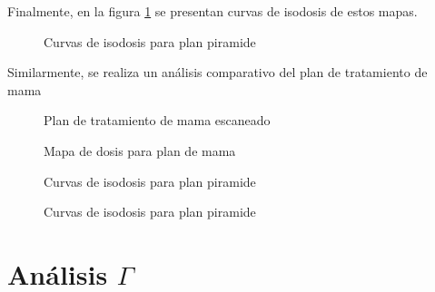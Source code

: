 Finalmente, en la figura \ref{fig:isodosisPiramide}  se presentan curvas de isodosis de estos mapas.\\ 
\begin{figure}
	\centering
	
	\caption{Curvas de isodosis para plan piramide }
	\label{fig:isodosisPiramide}
\end{figure}

Similarmente, se realiza un análisis comparativo del plan de tratamiento de mama 
\begin{figure}
	\centering
	
	\caption{Plan de tratamiento de mama escaneado }
	\label{fig:mamaEscaneada}
\end{figure}
\begin{figure}
	\centering
	
	\caption{Mapa de dosis para plan de mama }
	\label{fig:mapaMama}
\end{figure}
\begin{figure}
	\centering
	
	\caption{Curvas de isodosis para plan piramide }
	\label{fig:histogramaMama}
\end{figure}
\begin{figure}
	\centering
	
	\caption{Curvas de isodosis para plan piramide }
	\label{fig:isodosisMama}
\end{figure}
\section{Análisis $\Gamma$}
